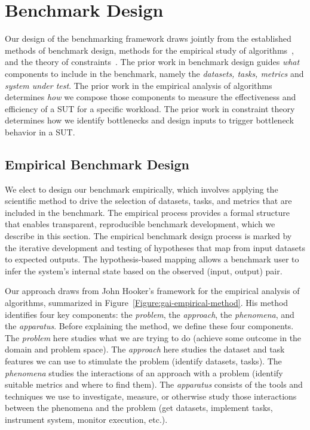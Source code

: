 \section{\gai Benchmark Design}
\label{section:43-GAI-Design}

Our design of the \gai benchmarking framework draws jointly from the established methods of benchmark design, methods for the empirical study of algorithms~\cite{Hooker1994, Hooker1995}, and the theory of constraints~\cite{Goldratt1990, Goldratt2004}.
The prior work in benchmark design guides \textit{what} components to include in the \gai benchmark, namely the \textit{datasets, tasks, metrics} and \textit{system under test}.
The prior work in the empirical analysis of algorithms determines \textit{how} we compose those components to measure the effectiveness and efficiency of a \ac{SUT} for a specific workload.
The prior work in constraint theory determines how we identify bottlenecks and design inputs to trigger bottleneck behavior in a \ac{SUT}.

\subsection{Empirical Benchmark Design}

We elect to design our \gai benchmark empirically, which involves applying the scientific method to drive the selection of datasets, tasks, and metrics that are included in the benchmark. 
The empirical process provides a formal structure that enables transparent, reproducible benchmark development, which we describe in this section.
The empirical benchmark design process is marked by the iterative development and testing of hypotheses that map from input datasets to expected outputs. 
The hypothesis-based mapping allows a benchmark user to infer the system's internal state based on the observed (input, output) pair.

Our approach draws from John Hooker's framework for the empirical analysis of algorithms, summarized in Figure~\ref{Figure:gai-empirical-method}. 
His method identifies four key components: the \textit{problem}, the \textit{approach}, the \textit{phenomena}, and the \textit{apparatus}.
Before explaining the method, we define these four components.
The \textit{problem} here studies what we are trying to do (achieve some outcome in the domain and problem space).
The \textit{approach} here studies the dataset and task features we can use to stimulate the problem (identify datasets, tasks).
The \textit{phenomena} studies the interactions of an approach with a problem (identify suitable metrics and where to find them).
The \textit{apparatus} consists of the tools and techniques we use to investigate, measure, or otherwise study those interactions between the phenomena and the problem (get datasets, implement tasks, instrument system, monitor execution, etc.).

